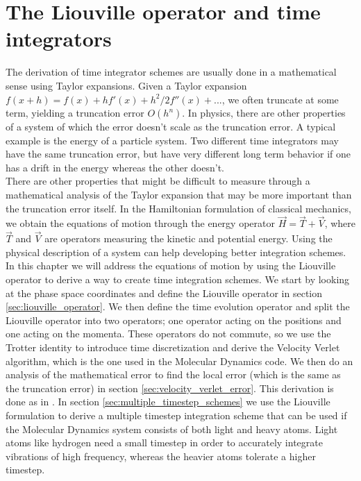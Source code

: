 \chapter{The Liouville operator and time integrators}
\label{app:liouville}
The derivation of time integrator schemes are usually done in a mathematical sense using Taylor expansions. Given a Taylor expansion $f(x+h) = f(x) + hf'(x) + h^2/2f''(x) + ...$, we often truncate at some term, yielding a truncation error $O(h^n)$. In physics, there are other properties of a system of which the error doesn't scale as the truncation error. A typical example is the energy of a particle system. Two different time integrators may have the same truncation error, but have very different long term behavior if one has a drift in the energy whereas the other doesn't.\\
There are other properties that might be difficult to measure through a mathematical analysis of the Taylor expansion that may be more important than the truncation error itself. In the Hamiltonian formulation of classical mechanics, we obtain the equations of motion through the energy operator $\vec H = \vec T + \vec V$, where $\vec T$ and $\vec V$ are operators measuring the kinetic and potential energy. Using the physical description of a system can help developing better integration schemes. \\
In this chapter we will address the equations of motion by using the Liouville operator to derive a way to create time integration schemes. We start by looking at the phase space coordinates and define the Liouville operator in section \ref{sec:liouville_operator}. We then define the time evolution operator and split the Liouville operator into two operators; one operator acting on the positions and one acting on the momenta.  These operators do not commute, so we use the Trotter identity to introduce time discretization and derive the Velocity Verlet algorithm, which is the one used in the Molecular Dynamics code. We then do an analysis of the mathematical error to find the local error (which is the same as the truncation error) in section \ref{sec:velocity_verlet_error}. This derivation is done as in \cite{frenkel2001understanding}. In section \ref{sec:multiple_timestep_schemes} we use the Liouville formulation to derive a multiple timestep integration scheme that can be used if the Molecular Dynamics system consists of both light and heavy atoms. Light atoms like hydrogen need a small timestep in order to accurately integrate vibrations of high frequency, whereas the heavier atoms tolerate a higher timestep. 
